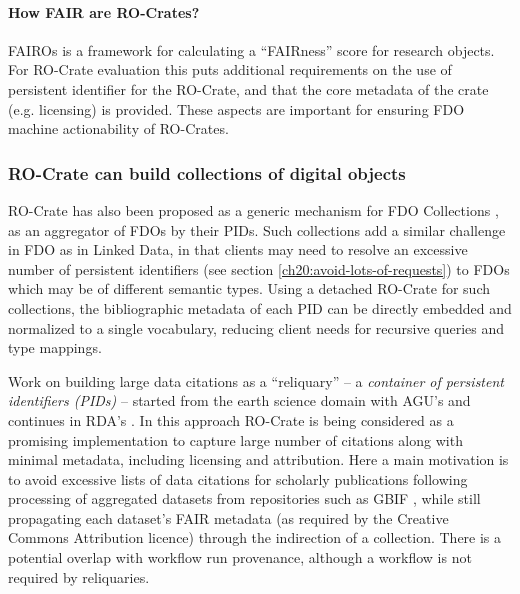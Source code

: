 \paragraph{How FAIR are RO-Crates?}
\label{ch61:fair-crates}

FAIROs \cite{FAIROs} is a framework for calculating a ``FAIRness'' score for research objects. For RO-Crate evaluation this puts additional requirements on the use of persistent identifier for the RO-Crate, and that the core metadata of the crate (e.g. licensing) is provided. These aspects are important for ensuring FDO machine actionability of RO-Crates.


\subsubsection{RO-Crate can build collections of digital objects}
\label{ch61:collections}

RO-Crate has also been proposed as a generic mechanism for FDO Collections \cite{fdo-collections}, as an aggregator of FDOs by their PIDs. Such collections add a similar challenge in FDO as in Linked Data, in that clients may need to resolve an excessive number of persistent identifiers (see section \vref{ch20:avoid-lots-of-requests}) to FDOs which may be of different semantic types. 
Using a detached RO-Crate for such collections, the bibliographic metadata of each PID can be directly embedded and normalized to a single vocabulary, reducing client needs for recursive queries and type mappings. 
 
Work on building large data citations as a ``reliquary'' -- a \emph{container of persistent identifiers (PIDs)} \cite{Buck 2022} -- started from the earth science domain with AGU's  and continues in RDA's . In this approach RO-Crate is being considered as a promising implementation to capture large number of citations along with minimal metadata, including licensing and attribution. Here a main motivation is to avoid excessive lists of data citations for scholarly publications following processing of aggregated datasets from repositories such as GBIF \cite{ch8-7}, while still propagating each dataset's FAIR metadata (as required by the Creative Commons Attribution licence) through the indirection of a collection. There is a potential overlap with workflow run provenance, although a workflow is not required by reliquaries.


